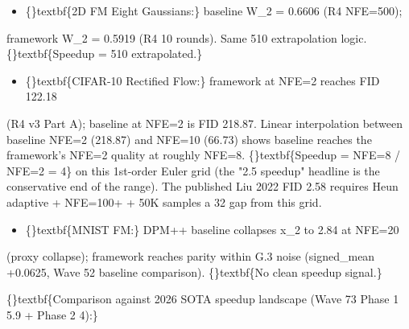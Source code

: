 \documentclass{article}
\begin{document}
\begin{itemize}
\item \{\}textbf\{2D FM Eight Gaussians:\} baseline W\_2 = 0.6606 (R4 NFE=500);
\end{itemize}
framework W\_2 = 0.5919 (R4 10 rounds). Same 510 extrapolation logic. \{\}textbf\{Speedup = 510 extrapolated.\}

\begin{itemize}
\item \{\}textbf\{CIFAR-10 Rectified Flow:\} framework at NFE=2 reaches FID 122.18
\end{itemize}
(R4 v3 Part A); baseline at NFE=2 is FID 218.87. Linear interpolation between baseline NFE=2 (218.87) and NFE=10 (66.73) shows baseline reaches the framework's NFE=2 quality at roughly NFE=8. \{\}textbf\{Speedup = NFE=8 / NFE=2 = 4\} on this 1st-order Euler grid (the "2.5 speedup" headline is the conservative end of the range). The published Liu 2022 FID 2.58 requires Heun adaptive + NFE=100+ + 50K samples  a 32 gap from this grid.

\begin{itemize}
\item \{\}textbf\{MNIST FM:\} DPM++ baseline collapses x\_2 to 2.84 at NFE=20
\end{itemize}
(proxy collapse); framework reaches parity within G.3 noise (signed\_mean +0.0625, Wave 52 baseline comparison). \{\}textbf\{No clean speedup signal.\}

\{\}textbf\{Comparison against 2026 SOTA speedup landscape (Wave 73 Phase 1 5.9 + Phase 2 4):\}
\end{document}
